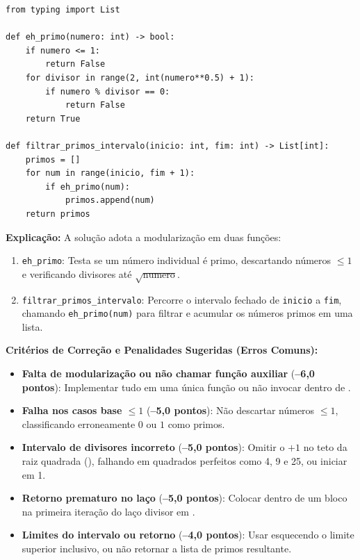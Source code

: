 \ifmostrarGabarito
\begin{verbatim}
from typing import List

def eh_primo(numero: int) -> bool:
    if numero <= 1:
        return False
    for divisor in range(2, int(numero**0.5) + 1):
        if numero % divisor == 0:
            return False
    return True

def filtrar_primos_intervalo(inicio: int, fim: int) -> List[int]:
    primos = []
    for num in range(inicio, fim + 1):
        if eh_primo(num):
            primos.append(num)
    return primos
\end{verbatim}

\textbf{Explicação:}
A solução adota a modularização em duas funções:
\begin{enumerate}
    \item \texttt{eh\_primo}: Testa se um número individual é primo, descartando números $\le 1$ e verificando divisores até $\sqrt{\text{numero}}$.
    \item \texttt{filtrar\_primos\_intervalo}: Percorre o intervalo fechado de \texttt{inicio} a \texttt{fim}, chamando \texttt{eh\_primo(num)} para filtrar e acumular os números primos em uma lista.
\end{enumerate}

\vspace{0.3cm}
\textbf{Critérios de Correção e Penalidades Sugeridas (Erros Comuns):}
\begin{itemize}[leftmargin=*, noitemsep, topsep=2pt]
    \item \textbf{Falta de modularização ou não chamar função auxiliar} (\textbf{--6,0 pontos}): Implementar tudo em uma única função ou não invocar  dentro de .
    \item \textbf{Falha nos casos base $\le 1$} (\textbf{--5,0 pontos}): Não descartar números $\le 1$, classificando erroneamente $0$ ou $1$ como primos.
    \item \textbf{Intervalo de divisores incorreto} (\textbf{--5,0 pontos}): Omitir o $+1$ no teto da raiz quadrada (), falhando em quadrados perfeitos como 4, 9 e 25, ou iniciar em 1.
    \item \textbf{Retorno prematuro no laço} (\textbf{--5,0 pontos}): Colocar  dentro de um bloco  na primeira iteração do laço divisor em .
    \item \textbf{Limites do intervalo ou retorno} (\textbf{--4,0 pontos}): Usar  esquecendo o limite superior inclusivo, ou não retornar a lista de primos resultante.
\end{itemize}
\else
{}
\clearpage
{}
\clearpage
\fi
